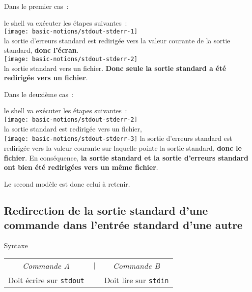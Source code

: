 Dans le premier cas~:
\begin{center}
\end{center}
le shell va ex{\'e}cuter les {\'e}tapes suivantes~:\\[0.5cm]
\texttt{[image: basic-notions/stdout-stderr-1]}	\\
la sortie d'erreurs standard est redirig{\'e}e vers la valeur courante de la sortie
standard, {\bf donc l'{\'e}cran}.\\[0.5cm]
\texttt{[image: basic-notions/stdout-stderr-2]} \\
la sortie standard vers un fichier. {\bf Donc seule la sortie standard a
{\'e}t{\'e} redirig{\'e}e vers un fichier}.

Dans le deuxi{\`e}me cas~:
\begin{center}
\end{center}
le shell va ex{\'e}cuter les {\'e}tapes suivantes~:\\[0.5cm]
	\texttt{[image: basic-notions/stdout-stderr-2]}	\\
la sortie standard est redirig{\'e}e vers un fichier,\\[0.5cm]
	\texttt{[image: basic-notions/stdout-stderr-3]}
la sortie d'erreurs standard est redirig{\'e}e vers la valeur courante sur laquelle
pointe la sortie standard, {\bf donc le fichier}. En cons{\'e}quence,
{\bf la sortie standard et la sortie d'erreurs standard ont bien {\'e}t{\'e} redirig{\'e}es vers un
m{\^e}me fichier}.

Le second mod{\`e}le est donc celui {\`a} retenir.

\subsection{Redirection de la sortie standard d'une commande dans
		l'entr{\'e}e standard d'une autre}

\begin{definition}{Syntaxe}
\begin{tabular}{ccc}
	\textsl{Commande A}				&	\texttt{|}	&	\textsl{Commande B}	\\
	Doit {\'e}crire sur \texttt{stdout}	&			&	Doit lire sur \texttt{stdin}\\
\end{tabular}
\end{definition}

